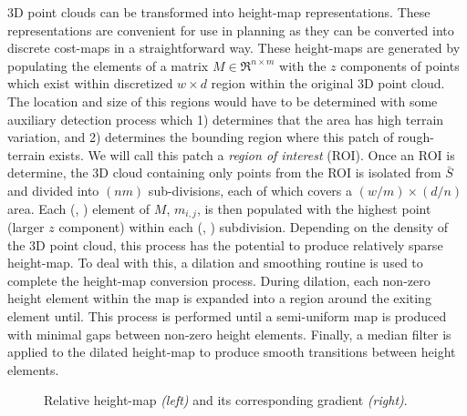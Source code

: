 				3D point clouds can be transformed into height-map representations. These representations are convenient for use in planning as they can be converted into discrete cost-maps in a straightforward way. These height-maps are generated by populating the elements of a matrix  $M\in \Re^{n\times m}$ with the $z$ components of points which exist within discretized $w\times d$ region within the original 3D point cloud. The location and size of this regions would have to be determined with some auxiliary detection process which 1) determines that the area has high terrain variation, and 2) determines the bounding region where this patch of rough-terrain exists. We will call this patch a \emph{region of interest} (ROI). Once an ROI is determine, the 3D cloud containing only points from the ROI is isolated from $\bar{S}$ and divided into $(nm)$ sub-divisions, each of which covers a $(w/m) \times (d/n)$ area. Each (\Ith, \Jth) element of $M$, $m_{i,j}$, is then populated with the highest point (larger  $z$ component) within each  (\Ith, \Jth) subdivision. Depending on the density of the 3D point cloud, this process has the potential to produce relatively sparse height-map. To deal with this, a dilation and smoothing routine is used to complete the height-map conversion process. During dilation, each non-zero height element within the map is expanded into a region around the exiting element until. This process is performed until a semi-uniform map is produced with minimal gaps between non-zero height elements. Finally, a median filter is applied to the dilated height-map to produce smooth transitions between height elements.
					\begin{figure}[t!]
						\centering
						\caption{Relative height-map \emph{(left)} and its corresponding gradient \emph{(right)}.}
						\label{fig::heightmap_terrain_patch}
					\end{figure}
